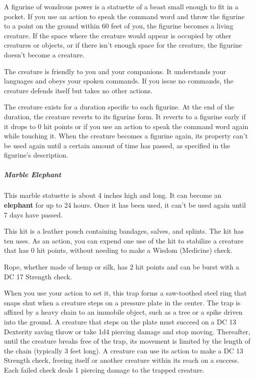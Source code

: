 \documentclass[10pt,a4paper,twoside,fancy,bg=print,twocolumn,openany,nodeprecatedcode]{dndbook}
\begin{document}
A figurine of wondrous power is a statuette of a beast small enough to fit in a pocket. If you use an action to speak the command word and throw the figurine to a point on the ground within 60 feet of you, the figurine becomes a living creature. If the space where the creature would appear is occupied by other creatures or objects, or if there isn't enough space for the creature, the figurine doesn't become a creature.

The creature is friendly to you and your companions. It understands your languages and obeys your spoken commands. If you issue no commands, the creature defends itself but takes no other actions.

The creature exists for a duration specific to each figurine. At the end of the duration, the creature reverts to its figurine form. It reverts to a figurine early if it drops to 0 hit points or if you use an action to speak the command word again while touching it. When the creature becomes a figurine again, its property can't be used again until a certain amount of time has passed, as specified in the figurine's description.

\subparagraph{Marble Elephant}
This marble statuette is about 4 inches high and long. It can become an \textbf{elephant} for up to 24 hours. Once it has been used, it can't be used again until 7 days have passed.

This kit is a leather pouch containing bandages, salves, and splints. The kit has ten uses. As an action, you can expend one use of the kit to stabilize a creature that has 0 hit points, without needing to make a Wisdom (Medicine) check.

Rope, whether made of hemp or silk, has 2 hit points and can be burst with a DC 17 Strength check.

When you use your action to set it, this trap forms a saw-toothed steel ring that snaps shut when a creature steps on a pressure plate in the center. The trap is affixed by a heavy chain to an immobile object, such as a tree or a spike driven into the ground. A creature that steps on the plate must succeed on a DC 13 Dexterity saving throw or take 1d4 piercing damage and stop moving. Thereafter, until the creature breaks free of the trap, its movement is limited by the length of the chain (typically 3 feet long). A creature can use its action to make a DC 13 Strength check, freeing itself or another creature within its reach on a success. Each failed check deals 1 piercing damage to the trapped creature.
\end{document}
